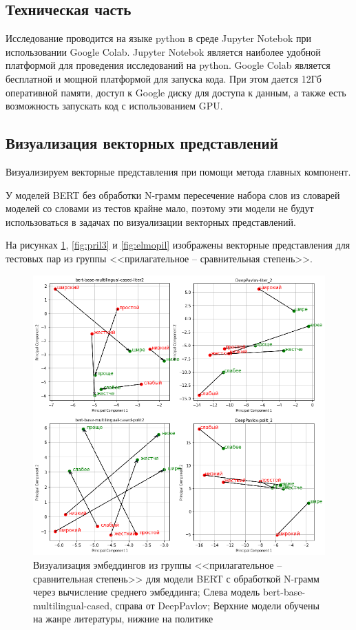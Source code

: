 \documentclass[a4paper,14pt]{article}
\begin{document}
\subsection{Техническая часть}

Исследование проводится на языке python в среде Jupyter Notebok при использовании Google Colab.
Jupyter Notebok является наиболее удобной платформой для проведения исследований на python.
Google Colab является бесплатной и мощной платформой для запуска кода.
При этом дается 12Гб оперативной памяти, доступ к Google диску для доступа к данным, а также есть возможность запускать код с использованием GPU.

\subsection{Визуализация векторных представлений}

Визуализируем векторные представления при помощи метода главных компонент.

У моделей BERT без обработки N-грамм пересечение набора слов из словарей моделей со словами из тестов крайне мало, поэтому эти модели не будут использоваться в задачах по визуализации векторных представлений.

На рисунках \ref{fig:pril2}, \ref{fig:pril3} и \ref{fig:elmopil} изображены векторные представления для тестовых пар из группы <<прилагательное -- сравнительная степень>>.

\begin{figure}[H]
	\centering
	\includegraphics[width=0.47\linewidth]{image/pril_2}
	\caption{Визуализация эмбеддингов из группы <<прилагательное -- сравнительная степень>> для модели BERT с обработкой N-грамм через вычисление среднего эмбеддинга; Слева модель bert-base-multilingual-cased, справа от DeepPavlov; Верхние модели обучены на жанре литературы, нижние на политике}
	\label{fig:pril2}
\end{figure}
\end{document}
